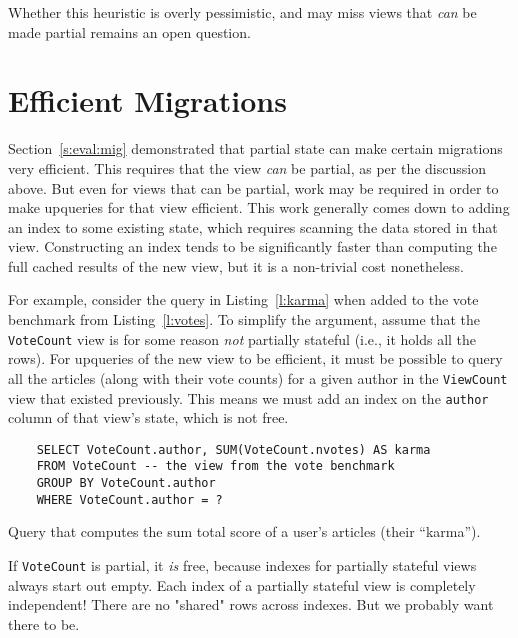 Whether this heuristic is overly pessimistic, and may miss views that \emph{can}
be made partial remains an open question.

\section{Efficient Migrations}

Section~\ref{s:eval:mig} demonstrated that partial state can make certain
migrations very efficient. This requires that the view \emph{can} be partial, as
per the discussion above. But even for views that can be partial, work may be
required in order to make upqueries for that view efficient. This work generally
comes down to adding an index to some existing state, which requires scanning
the data stored in that view. Constructing an index tends to be significantly
faster than computing the full cached results of the new view, but it is a
non-trivial cost nonetheless.

For example, consider the query in Listing~\ref{l:karma} when added to the vote
benchmark from Listing~\ref{l:votes}. To simplify the argument, assume that the
\texttt{VoteCount} view is for some reason \emph{not} partially stateful (i.e.,
it holds all the rows). For upqueries of the new view to be efficient, it must
be possible to query all the articles (along with their vote counts) for a given
author in the \texttt{ViewCount} view that existed previously. This means we
must add an index on the \texttt{author} column of that view's state, which is
not free.

\begin{listing}[h]
  \begin{verbatim}
    SELECT VoteCount.author, SUM(VoteCount.nvotes) AS karma
    FROM VoteCount -- the view from the vote benchmark
    GROUP BY VoteCount.author
    WHERE VoteCount.author = ?
  \end{verbatim}
  \caption{Query that computes the sum total score of a user's articles
  (their ``karma'').}
  \label{l:scanning-votes}
\end{listing}

\begin{inprogress}
  If \texttt{VoteCount} is partial, it \emph{is} free, because indexes for
  partially stateful views always start out empty. Each index of a partially
  stateful view is completely independent! There are no "shared" rows across
  indexes. But we probably want there to be.
\end{inprogress}

